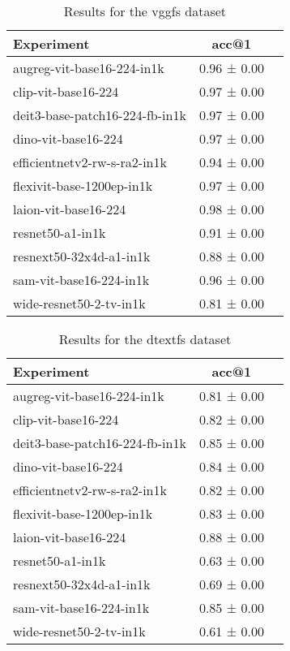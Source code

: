\begin{table}[htbp]
\caption{Results for the vggfs dataset}
\begin{tabular}{|l|c|c|}\hline
Experiment & acc@1\\
\hline
augreg-vit-base16-224-in1k & 0.96 ± 0.00\\
\hline
clip-vit-base16-224 & 0.97 ± 0.00\\
\hline
deit3-base-patch16-224-fb-in1k & 0.97 ± 0.00\\
\hline
dino-vit-base16-224 & 0.97 ± 0.00\\
\hline
efficientnetv2-rw-s-ra2-in1k & 0.94 ± 0.00\\
\hline
flexivit-base-1200ep-in1k & 0.97 ± 0.00\\
\hline
laion-vit-base16-224 & 0.98 ± 0.00\\
\hline
resnet50-a1-in1k & 0.91 ± 0.00\\
\hline
resnext50-32x4d-a1-in1k & 0.88 ± 0.00\\
\hline
sam-vit-base16-224-in1k & 0.96 ± 0.00\\
\hline
wide-resnet50-2-tv-in1k & 0.81 ± 0.00\\
\hline
\end{tabular}
\end{table}

\begin{table}[htbp]
\caption{Results for the dtextfs dataset}
\begin{tabular}{|l|c|c|}\hline
Experiment & acc@1\\
\hline
augreg-vit-base16-224-in1k & 0.81 ± 0.00\\
\hline
clip-vit-base16-224 & 0.82 ± 0.00\\
\hline
deit3-base-patch16-224-fb-in1k & 0.85 ± 0.00\\
\hline
dino-vit-base16-224 & 0.84 ± 0.00\\
\hline
efficientnetv2-rw-s-ra2-in1k & 0.82 ± 0.00\\
\hline
flexivit-base-1200ep-in1k & 0.83 ± 0.00\\
\hline
laion-vit-base16-224 & 0.88 ± 0.00\\
\hline
resnet50-a1-in1k & 0.63 ± 0.00\\
\hline
resnext50-32x4d-a1-in1k & 0.69 ± 0.00\\
\hline
sam-vit-base16-224-in1k & 0.85 ± 0.00\\
\hline
wide-resnet50-2-tv-in1k & 0.61 ± 0.00\\
\hline
\end{tabular}
\end{table}

